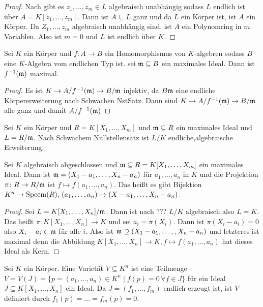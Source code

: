 \begin{proof}
    Nach  gibt es \(z_1,\dots,z_m\in L\) algebraisch unabhängig sodass \(L\) endlich ist über \(A=K[z_1,\dots,z_m]\).
    Dann ist \(A\subseteq L\) ganz und da \(L\) ein Körper ist, ist \(A\) ein Körper.
    Da \(Z_1,\dots,z_m\) algebraisch unabhängig sind, ist \(A\) ein Polynomring in \(m\) Variablen. Also ist \(m=0\) und \(L\) ist endlich über \(K\).
\end{proof}
\begin{Kor}
    Sei \(K\) ein Körper und \(f\colon A\to B\) ein Homomorphismus von \(K\)-algebren sodass \(B\) eine \(K\)-Algebra vom endlichen Typ ist. sei \(\mathfrak{m}\subseteq B\) ein maximales Ideal. Dann ist \(f^{-1}(\mathfrak{m})\) maximal.
\end{Kor}
\begin{proof}
    Es ist \(K\to A/f^{-1}(\mathfrak{m})\to B/\mathfrak{m}\) injektiv, da \(B\mathfrak{m}\) eine endliche Körpererweiterung nach Schwachen NstSatz. Dann sind \(K\to A/f^{-1}(\mathfrak{m})\to B/\mathfrak{m}\) alle ganz und damit \(A/f^{-1}(\mathfrak{m})\) %
\end{proof}
\begin{Bsp}
    Sei \(K\) ein Körper und \(R=K[X_1,\dots,X_m]\) und \(\mathfrak{m}\subseteq R\) ein maximales Ideal und \(L=R/\mathfrak{m}\).
    Nach Schwachem Nullstellensatz ist \(L/K\) endliche,algebraische Erweiterung.
    
\end{Bsp}
\begin{Kor}
    Sei \(K\) algebraisch abgeschlossen und \(\mathfrak{m}\subseteq R=K[X_1,\dots,X_m]\) ein maximales Ideal. Dann ist \(\mathfrak{m}=(X_1-a_1,\dots,X_n-a_n)\) für \(a_1,\dots,a_n\) in \(K\) und die Projektion \(\pi\colon R\to R/\mathfrak{m}\) ist \(f\mapsto f(a_1,\dots,a_n)\).
    Das heißt es gibt Bijektion \(K^n\to \operatorname{Specm}(R),\, (a_1,\dots,a_n)\mapsto (X-a_1,\dots,X_n-a_n)\).
\end{Kor}
\begin{proof}
    Sei \(L=K[X_1,\dots,X_n]/\mathfrak{m}\). Dann ist nach ??? \(L/K\) algebraisch also \(L=K\).
    Das heißt \(\pi\colon K[X_1,\dots,X_n]\to K\) und sei \(a_i=\pi(X_i)\).
    Dann ist \(\pi(X_i-a_i)=0\) also \(X_i-a_i\in\mathfrak{m}\) für alle \(i\).
    Also ist \(\mathfrak{m}\supseteq (X_1-a_1,\dots,,X_n-a_n)\) und letzteres ist maximal denn die Abbildung \(K[X_1,\dots,X_n]\to K, f\mapsto f(a_1,\dots,a_n)\) hat dieses Ideal als Kern.
\end{proof}
\begin{Def}
    Sei \(K\) ein Körper. Eine Varietät \(V\subseteq K^n\) ist eine Teilmenge \(V=V(J)=\{p=(a_1,\dots,a_n)\in K^n\mid f(p)=0\, \forall f\in J\}\)  für ein Ideal \(J\subseteq K[X_1,\dots,X_n]\) ein Ideal. Da \(J=(f_1,\dots,f_m)\) endlich erzeugt ist, ist \(V\) definiert durch \(f_1(p)=\dots=f_m(p)=0\).
\end{Def}
